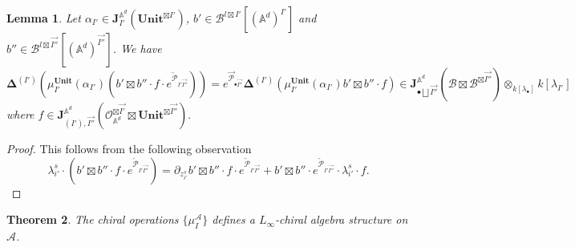 \documentclass[11pt]{amsart}
\newtheorem{thm}{Theorem}[section]
\newtheorem{lem}[thm]{Lemma}
\theoremstyle{definition}
\theoremstyle{remark}
\numberwithin{equation}{section}
\begin{document}
\iffalse
$$
\mathbf{L}=\frac{\mathbf{J}_{\mathring{\mathbb{A}^d}}\otimes L^{\vee}[d-1]\oplus \mathbf{J}_{\mathring{\mathbb{A}^d}}(\omega_{\mathbb{A}^d}^{-1})\otimes L}{\mathcal{O}[\mathbb{A}^d]\otimes L^{\vee}[d-1]\oplus \omega_{\mathbb{A}^d}^{-1}[\mathbb{A}^d]\otimes L}
$$
\fi
\begin{lem}
    Let $\alpha_{ I'}\in \mathbf{J}^{\mathbb{A}^d}_{ I'}(\mathbf{Unit}^{\boxtimes  I'}) $, $b'\in \mathcal{B}^{l\boxtimes  I'}[(\mathbb{A}^d)^{ I'}] $ and $b''\in \mathcal{B}^{l\boxtimes \vec{I''}}[(\mathbb{A}^d)^{\vec{I''}}] $. We have
    $$
    \mathbf{\Delta}^{(I')}\left(\mu^{\mathbf{Unit}}_{ I'}(\alpha_{ I'})(b'\boxtimes b''\cdot f\cdot e^{\overleftarrow{\mathcal{P}}_{ I'\vec{I''}}})\right)=e^{\overrightarrow{\mathcal{P}}_{\bullet\overrightarrow{I''}}}\mathbf{\Delta}^{(I')}\left(\mu^{\mathbf{Unit}}_{ I'}(\alpha_{ I'})b'\boxtimes b''\cdot f \right)\in \mathbf{J}_{\bullet\bigsqcup\vec{I''}}^{\mathbb{A}^d}(\mathcal{B}\boxtimes \mathcal{B}^{\boxtimes\vec{I''}})\otimes_{k[\lambda_{\bullet}]}k[\lambda_{I'}]
    $$
    where $f\in \mathbf{J}_{( I'),\vec{{I''}}}^{\mathbb{A}^d}(\mathcal{O}_{\mathbb{A}^d}^{\boxtimes\overrightarrow{I'}}\boxtimes\mathbf{Unit}^{\boxtimes\vec{I''}}).
$
\end{lem}
\begin{proof}
    This follows from the following observation
    $$
    \lambda^s_{i'}\cdot \left(b'\boxtimes b''\cdot f\cdot e^{\overleftarrow{\mathcal{P}}_{ I'\vec{I''}}}\right)=\partial_{z^s_{i'}}b'\boxtimes b''\cdot f\cdot e^{\overleftarrow{\mathcal{P}}_{ I'\vec{I''}}}+b'\boxtimes b''\cdot e^{\overleftarrow{\mathcal{P}}_{ I'\vec{I''}}}\cdot \lambda^s_{i'} \cdot f.
    $$
\end{proof}
\begin{thm}
    The chiral operations $\{\mu^{\mathcal{A}}_{ I}\}$ defines a $L_{\infty}$-chiral algebra structure on $\mathcal{A}$.
\end{thm}
\end{document}
